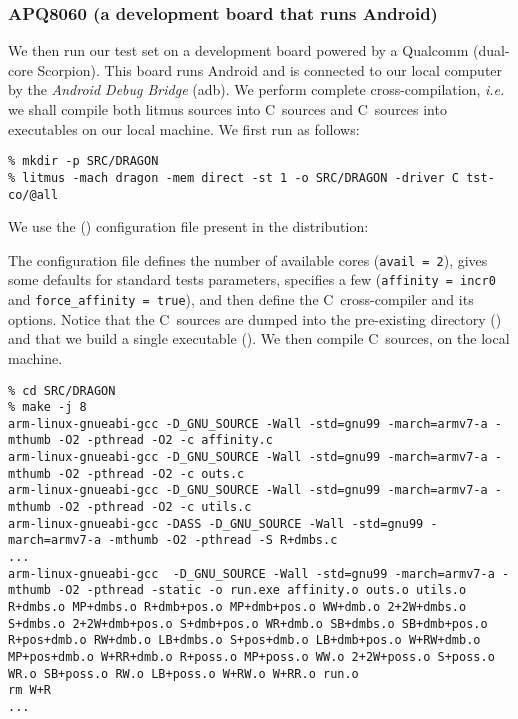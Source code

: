 \subsubsection{\label{driverc:example}APQ8060 (a development board that runs Android)}
We then run our test set on a development board
powered by a Qualcomm  (dual-core Scorpion).
This board runs Android and is connected to our local computer
by the \emph{Android Debug Bridge} (adb).
We perform complete cross-compilation, \emph{i.e.} we shall compile
both litmus sources into C~sources and C~sources into executables
on our local machine. We first run  as follows:
\begin{verbatim}
% mkdir -p SRC/DRAGON
% litmus -mach dragon -mem direct -st 1 -o SRC/DRAGON -driver C tst-co/@all
\end{verbatim}
We use the  () configuration file present
in the  distribution:

The configuration file defines the number of available cores
(\verb+avail = 2+),
gives some defaults for standard tests parameters,
specifies a few 
(\verb+affinity = incr0+ and \verb+force_affinity = true+), and then
define the C~cross-compiler and its options.
Notice that the C~sources are dumped into the pre-existing
directory () and that we build a single executable
().
We then compile C~sources, on the local machine.
\begin{verbatim}
% cd SRC/DRAGON
% make -j 8
arm-linux-gnueabi-gcc -D_GNU_SOURCE -Wall -std=gnu99 -march=armv7-a -mthumb -O2 -pthread -O2 -c affinity.c
arm-linux-gnueabi-gcc -D_GNU_SOURCE -Wall -std=gnu99 -march=armv7-a -mthumb -O2 -pthread -O2 -c outs.c
arm-linux-gnueabi-gcc -D_GNU_SOURCE -Wall -std=gnu99 -march=armv7-a -mthumb -O2 -pthread -O2 -c utils.c
arm-linux-gnueabi-gcc -DASS -D_GNU_SOURCE -Wall -std=gnu99 -march=armv7-a -mthumb -O2 -pthread -S R+dmbs.c
...
arm-linux-gnueabi-gcc  -D_GNU_SOURCE -Wall -std=gnu99 -march=armv7-a -mthumb -O2 -pthread -static -o run.exe affinity.o outs.o utils.o R+dmbs.o MP+dmbs.o R+dmb+pos.o MP+dmb+pos.o WW+dmb.o 2+2W+dmbs.o S+dmbs.o 2+2W+dmb+pos.o S+dmb+pos.o WR+dmb.o SB+dmbs.o SB+dmb+pos.o R+pos+dmb.o RW+dmb.o LB+dmbs.o S+pos+dmb.o LB+dmb+pos.o W+RW+dmb.o MP+pos+dmb.o W+RR+dmb.o R+poss.o MP+poss.o WW.o 2+2W+poss.o S+poss.o WR.o SB+poss.o RW.o LB+poss.o W+RW.o W+RR.o run.o
rm W+R
...
\end{verbatim}
